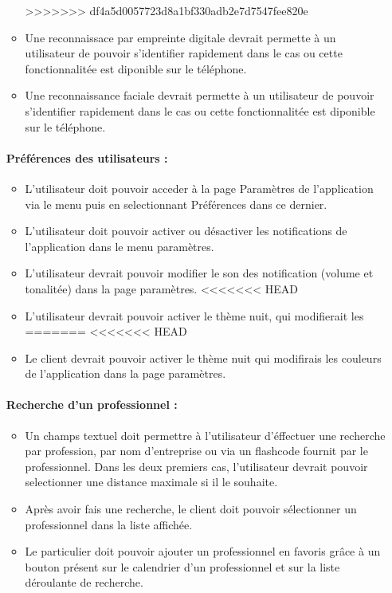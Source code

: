 \documentclass{article}
\begin{document}
\begin{itemize}
\begin{itemize}
>>>>>>> df4a5d0057723d8a1bf330adb2e7d7547fee820e
\item Une reconnaissace par empreinte digitale devrait permette à un
  utilisateur de pouvoir s'identifier rapidement dans le cas ou cette
  fonctionnalitée est diponible sur le téléphone.
\item Une reconnaissance faciale devrait permette à un
  utilisateur de pouvoir s'identifier rapidement dans le cas ou cette
  fonctionnalitée est diponible sur le téléphone.
\end{itemize}

\paragraph{Préférences des utilisateurs :}
\begin{itemize}
\item L'utilisateur doit pouvoir acceder à la page \og Paramètres \fg{} de l'application via le menu
 puis en selectionnant \og Préférences \fg{}
  dans ce dernier.
\item L'utilisateur doit pouvoir activer ou désactiver les notifications
  de l'application dans le menu paramètres.
\item L'utilisateur devrait pouvoir modifier le son des notification
  (volume et tonalitée) dans la page paramètres.
<<<<<<< HEAD
\item L'utilisateur devrait pouvoir activer le thème nuit, qui modifierait les
=======
<<<<<<< HEAD
\item Le client devrait pouvoir activer le thème nuit qui modifirais les
  couleurs de l'application dans la page paramètres.
\end{itemize}
\paragraph{Recherche d'un professionnel :}
\begin{itemize}
\item Un champs textuel doit permettre à l'utilisateur d'éffectuer une
  recherche par profession, par nom
  d'entreprise ou via un flashcode fournit par le professionnel. Dans
  les deux premiers cas, l'utilisateur devrait pouvoir selectionner
  une distance maximale si il le souhaite.
\item Après avoir fais une recherche, le client doit pouvoir sélectionner un
  professionnel dans la liste affichée.
\item Le particulier doit pouvoir ajouter un professionnel en favoris grâce
  à un bouton présent sur le calendrier d'un professionnel et sur la
  liste déroulante de recherche.


\end{itemize}
\end{itemize}
\end{document}
